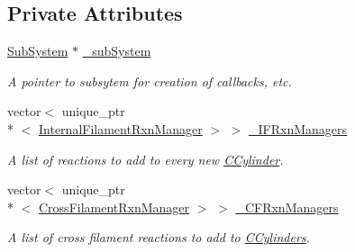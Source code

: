 \subsection*{Private Attributes}
\begin{DoxyCompactItemize}
\item 
\hyperlink{classSubSystem}{Sub\+System} $\ast$ \hyperlink{classSimpleManagerImpl_a3815d1181b7c1a25aca95701dd6d8188}{\+\_\+sub\+System}
\begin{DoxyCompactList}\small\item\em A pointer to subsytem for creation of callbacks, etc. \end{DoxyCompactList}\item 
vector$<$ unique\+\_\+ptr\\*
$<$ \hyperlink{classInternalFilamentRxnManager}{Internal\+Filament\+Rxn\+Manager} $>$ $>$ \hyperlink{classSimpleManagerImpl_a577d86758aa99cd7ebf965872dfce50f}{\+\_\+\+I\+F\+Rxn\+Managers}
\begin{DoxyCompactList}\small\item\em A list of reactions to add to every new \hyperlink{classCCylinder}{C\+Cylinder}. \end{DoxyCompactList}\item 
vector$<$ unique\+\_\+ptr\\*
$<$ \hyperlink{classCrossFilamentRxnManager}{Cross\+Filament\+Rxn\+Manager} $>$ $>$ \hyperlink{classSimpleManagerImpl_a62c7e79906c431487c9c97474c6aab6e}{\+\_\+\+C\+F\+Rxn\+Managers}
\begin{DoxyCompactList}\small\item\em A list of cross filament reactions to add to \hyperlink{classCCylinder}{C\+Cylinders}. \end{DoxyCompactList}\end{DoxyCompactItemize}
{\bf }\par

